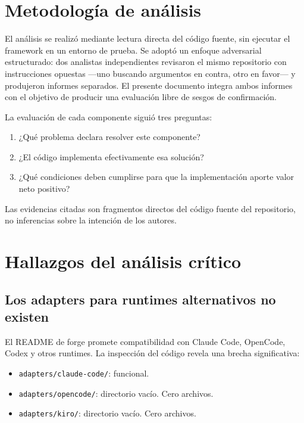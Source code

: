 \documentclass[12pt,a4paper]{article}
\begin{document}
\section{Metodología de análisis}

El análisis se realizó mediante lectura directa del código fuente, sin ejecutar
el framework en un entorno de prueba. Se adoptó un enfoque adversarial estructurado:
dos analistas independientes revisaron el mismo repositorio con instrucciones opuestas
---uno buscando argumentos en contra, otro en favor--- y produjeron informes separados.
El presente documento integra ambos informes con el objetivo de producir una evaluación
libre de sesgos de confirmación.

La evaluación de cada componente siguió tres preguntas:

\begin{enumerate}
  \item ¿Qué problema declara resolver este componente?
  \item ¿El código implementa efectivamente esa solución?
  \item ¿Qué condiciones deben cumplirse para que la implementación aporte valor neto positivo?
\end{enumerate}

Las evidencias citadas son fragmentos directos del código fuente del repositorio,
no inferencias sobre la intención de los autores.

\section{Hallazgos del análisis crítico}

\subsection{Los adapters para runtimes alternativos no existen}

El README de forge promete compatibilidad con Claude Code, OpenCode, Codex y otros
runtimes. La inspección del código revela una brecha significativa:

\begin{itemize}
  \item \texttt{adapters/claude-code/}: funcional.
  \item \texttt{adapters/opencode/}: directorio vacío. Cero archivos.
  \item \texttt{adapters/kiro/}: directorio vacío. Cero archivos.
\end{itemize}
\end{document}
